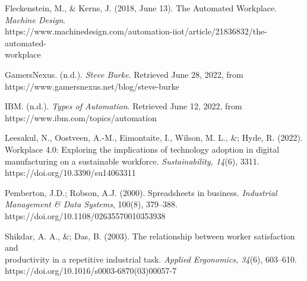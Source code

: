 \documentclass[12pt]{article}
\begin{document}
Fleckenstein, M., \& Kerns, J. (2018, June 13). The Automated Workplace. \emph{Machine Design}. \\
\indent\hspace{0.5in} https://www.machinedesign.com/automation-iiot/article/21836832/the-automated-\\
\indent\hspace{0.5in} workplace

GamersNexus. (n.d.). \emph{Steve Burke}. Retrieved June 28, 2022, from \\
\indent\hspace{0.5in} https://www.gamersnexus.net/blog/steve-burke

IBM. (n.d.). \emph{Types of Automation}. Retrieved June 12, 2022, from \\
\indent\hspace{0.5in} https://www.ibm.com/topics/automation

Leesakul, N., Oostveen, A.-M., Eimontaite, I., Wilson, M. L., \&; Hyde, R. (2022). \\
\indent\hspace{0.5in} Workplace 4.0: Exploring the implications of technology adoption in digital \\
\indent\hspace{0.5in} manufacturing on a sustainable workforce. \emph{Sustainability, 14}(6), 3311. \\
\indent\hspace{0.5in} https://doi.org/10.3390/su14063311 

\newpage
Pemberton, J.D.; Robson, A.J. (2000). Spreadsheets in business. \emph{Industrial Management \& \indent\hspace{0.5in}  Data Systems}, 100(8), 379–388. \\ 
\indent\hspace{0.5in}  https://doi.org/10.1108/02635570010353938 

Shikdar, A. A., \&; Das, B. (2003). The relationship between worker satisfaction and \\
\indent\hspace{0.5in} productivity in a repetitive industrial task. \emph{Applied Ergonomics, 34}(6), 603–610. \\ 
\indent\hspace{0.5in} https://doi.org/10.1016/s0003-6870(03)00057-7 




\end{document}
